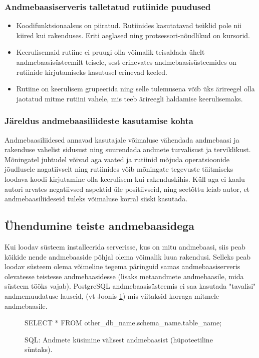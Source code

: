 \documentclass[a4paper,12pt]{article} %
\begin{document}
\subsubsection{Andmebaasiserveris talletatud rutiinide puudused}
\begin{itemize}
\item Koodifunktsionaalsus on piiratud. Rutiinides kasutatavad tsüklid pole nii kiired kui rakenduses. Eriti aeglased ning protsessori-nõudlikud on kursorid.
\item Keerulisemaid rutiine ei pruugi olla võimalik teisaldada ühelt andmebaasisüsteemilt teisele, sest erinevates andmebaasisüsteemides on rutiinide kirjutamiseks kasutusel erinevad keeled.
\item Rutiine on keerulisem grupeerida ning selle tulemusena võib üks ärireegel olla jaotatud mitme rutiini vahele, mis teeb ärireegli haldamise keerulisemaks.
\end{itemize}
\cite{StoredProcProsAndCons}

\subsubsection{Järeldus andmebaasiliideste kasutamise kohta}
Andmebaasiliidesed annavad kasutajale võimaluse vähendada andmebaasi ja rakenduse vahelist sidusust ning suurendada andmete turvalisust ja terviklikust. Mõningatel juhtudel võivad aga vaated ja rutiinid mõjuda operatsioonide jõudlusele nagatiivselt ning rutiinides võib mõningate tegevuste täitmiseks loodava koodi kirjutamine olla keerulisem kui rakenduskihis. Küll aga ei kaalu autori arvates negatiivsed aspektid üle positiivseid, ning seetõttu leiab autor, et andmebaasiliideseid tuleks võimaluse korral siiski kasutada.

\subsection{Ühendumine teiste andmebaasidega}
Kui loodav süsteem installeerida serverisse, kus on mitu andmebaasi, siis  peab kõikide nende andmebaaside põhjal olema võimalik luua rakendusi. Selleks peab loodav süsteem olema võimeline tegema päringuid samas andmebaasiserveris olevatesse teistesse andmebaasidesse (lisaks metaandmete andmebaasile, mida süsteem tööks vajab). PostgreSQL andmebaasisüsteemis ei saa kasutada "tavalisi" andmemuudatuse lauseid, (vt Joonis \ref{fig_sql_andmete_küsimine_välisest_andmebaasist}) mis viitaksid korraga mitmele andmebaasile.
\begin{figure}[H]
\centering
\begin{SQL}
SELECT * FROM other_db_name.schema_name.table_name;
\end{SQL}
\caption{SQL: Andmete küsimine välisest andmebaasist (hüpoteetiline süntaks).}
\label{fig_sql_andmete_küsimine_välisest_andmebaasist}
\end{figure}
\end{document}

